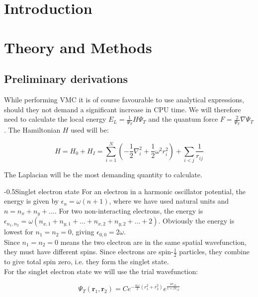 \documentclass[english, a4paper]{article}
\makeatletter
\renewcommand{\subsubsection}{\@startsection{subsubsection}{3}{0pt}%
{-\baselineskip}{0.5\baselineskip}{\bf\large}}
\newcommand{\bm}[1]{\mathbf{#1}}
\makeatother
\begin{document}
\section{Introduction}


\section{Theory and Methods}
\subsection{Preliminary derivations}
While performing VMC it is of course favourable to use analytical expressions, should they not demand a significant increase in CPU time. We will therefore need to calculate the local energy $E_L = \frac{1}{\Psi_T}H\Psi_T$ and the quantum force $F = \frac{2}{\Psi_T}\nabla\Psi_T$. The Hamiltonian $H$ used will be:

\begin{equation}
	H = H_0 + H_I = \sum_{i=1}^{N}\left(-\frac{1}{2}\nabla_i^2 + \frac{1}{2}\omega^2r_i^2\right) + \sum_{i<j}\frac{1}{r_{ij}}
\end{equation}

The Laplacian will be the most demanding quantity to calculate.

\subsubsection{Singlet electron state}
For an electron in a harmonic oscillator potential, the energy is given by $\epsilon_n = \omega(n + 1)$, where we have used natural units and $n = n_x + n_y + \ldots$. For two non-interacting electrons, the energy is $\epsilon_{n_1,n_2} = \omega(n_{x,1} + n_{y,1} + \ldots + n_{x,2} + n_{y,2} + \ldots + 2)$. Obviously the energy is lowest for $n_1 = n_2 = 0$, giving $\epsilon_{0,0} = 2\omega$.\\
Since $n_1=n_2 = 0$ means the two electron are in the same spatial wavefunction, they must have different spins. 
Since electrons are spin-$\frac{1}{2}$ particles, they combine to give total spin zero, i.e. they form the singlet state.\\

For the singlet electron state we will use the trial wavefunction:

\begin{equation}
	\Psi_T(\bm{r}_1,\bm{r}_2) = Ce^{-\frac{\alpha\omega}{2}(r_1^2+r_2^2)}e^{\frac{ar_{12}}{1+\beta r_{12}}}
\end{equation}
\end{document}
